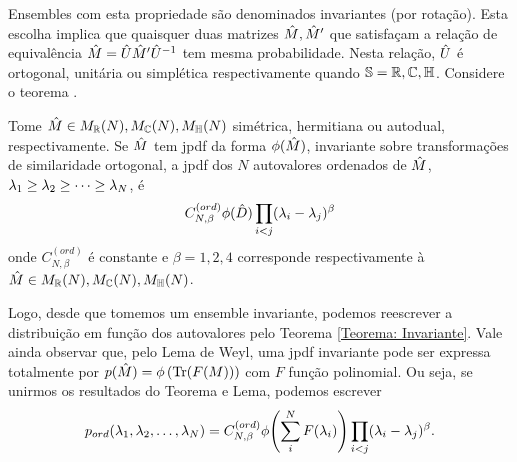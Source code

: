 Ensembles com esta propriedade são denominados invariantes (por rotação). Esta escolha implica que quaisquer duas matrizes $\hat M, \hat M'$ que satisfaçam a relação de equivalência $\hat M = \hat U \hat M' \hat U^{-1}$ tem mesma probabilidade. Nesta relação, $\hat U$ é ortogonal, unitária ou simplética respectivamente quando $\mathbb{S} = \mathbb{R},\mathbb{C},\mathbb{H} $. Considere o teorema \cite[Capítulo~3]{AlanThesis}.
\begin{thm}
	Tome $\hat M \in M_{\mathbb{R}}(N),  M_{\mathbb{C}}(N),  M_{\mathbb{H}}(N)$ simétrica, hermitiana ou autodual, respectivamente. Se  $\hat M$ tem jpdf da forma $\phi(\hat M)$, invariante sobre transformações de similaridade ortogonal, a jpdf dos $N$ autovalores ordenados de $\hat M$, $\lambda_1 \geq \lambda_2 \geq \dots \geq \lambda_N$, é $$ C_{N, \beta}^{(ord)} \phi(\hat D) \prod_{i < j} (\lambda_i - \lambda_j)^{\beta}$$ onde $C_{N, \beta}^{(ord)}$ é constante e $\beta = 1, 2, 4$ corresponde respectivamente à $\hat M \in M_{\mathbb{R}}(N),  M_{\mathbb{C}}(N),  M_{\mathbb{H}}(N)$. 
	\label{Teorema: Invariante}
\end{thm}
Logo, desde que tomemos um ensemble invariante, podemos reescrever a distribuição em função dos autovalores pelo Teorema \ref{Teorema: Invariante}. Vale ainda observar que, pelo Lema de Weyl, uma jpdf invariante pode ser expressa totalmente por $p(\hat M)= \phi \left(\Tr(F(M)) \right)$ com $F$ função polinomial. Ou seja, se unirmos os resultados do Teorema e Lema, podemos escrever
\begin{equation}
	p_{ord}(\lambda_1, \lambda_2, \dots, \lambda_N) = C_{N, \beta}^{(ord)} \phi{\left( \sum_i^N F(\lambda_i) \right)} \prod_{i < j} (\lambda_i - \lambda_j)^{\beta}.
	\label{Equation: p-ord}
\end{equation}


